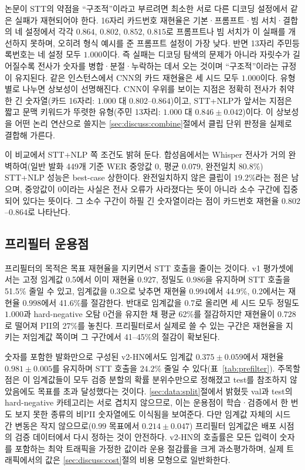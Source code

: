 \documentclass[10pt,twocolumn]{article}
\begin{document}
논문이 STT의 약점을 ``구조적''이라고 부르려면 최소한 서로 다른 디코딩 설정에서 같은 실패가
재현되어야 한다. 16자리 카드번호 재현율은 기본·프롬프트·빔 서치·결합의 네 설정에서 각각
$0.864$, $0.802$, $0.852$, $0.815$로 프롬프트나 빔 서치가 이 실패를 개선하지 못하며, 오히려
형식 예시를 준 프롬프트 설정이 가장 낮다. 반면 13자리 주민등록번호는 네 설정 모두 $1.000$이다.
즉 실패는 디코딩 탐색의 문제가 아니라 자릿수가 길어질수록 전사가 숫자를 병합·분절·누락하는 데서
오는 것이며 ``구조적''이라는 규정이 유지된다. 같은 인스턴스에서 CNN의 카드 재현율은 세 시드 모두
$1.000$이다. 유형별로 나누면 상보성이 선명해진다. CNN이 우위를 보이는 지점은 정확히 전사가
취약한 긴 숫자열(카드 16자리: $1.000$ 대 $0.802$--$0.864$)이고, STT+NLP가 앞서는 지점은 짧고
문맥 키워드가 뚜렷한 유형(주민 13자리: $1.000$ 대 $0.846\pm0.042$)이다. 이 상보성을 어떤 논리 연산으로 쓸지는 \ref{sec:discuss:combine}절에서 클립 단위 판정을 실제로
결합해 가른다.

이 비교에서 STT+NLP 쪽 조건도 밝혀 둔다. 합성음에서는 Whisper 전사가 거의 완벽하여(일반 발화
449개 기준 WER 중앙값 $0$, 평균 $0.079$, 완전일치 $80.8\%$) STT+NLP 성능은 best-case 상한이다.
완전일치하지 않은 클립이 $19.2\%$라는 점은 남으며, 중앙값이 0이라는 사실은 전사 오류가
사라졌다는 뜻이 아니라 소수 구간에 집중되어 있다는 뜻이다. 그 소수 구간이 하필 긴 숫자열이라는
점이 카드번호 재현율 $0.802$--$0.864$로 나타난다.

\subsection{프리필터 운용점}
프리필터의 목적은 목표 재현율을 지키면서 STT 호출을 줄이는 것이다. v1 평가셋에서는 고정 임계값
0.5에서 이미 재현율 $0.927$, 정밀도 $0.986$을 유지하며 STT 호출을 51.5\% 줄일 수 있고, 임계값을
0.3으로 낮추면 재현율 $0.994$에서 44.9\%, 0.2에서는 재현율 $0.998$에서 41.6\%를 절감한다. 반대로
임계값을 0.7로 올리면 세 시드 모두 정밀도 $1.000$과 hard-negative 오탐 0건을 유지한 채 평균
62\%를 절감하지만 재현율이 $0.728$로 떨어져 PII의 27\%를 놓친다. 프리필터로서 실제로 쓸 수 있는
구간은 재현율을 지키는 저임계값 쪽이며 그 구간에서 41--45\%의 절감이 확보된다.

숫자를 포함한 발화만으로 구성된 v2-HN에서도 임계값 $0.375\pm0.059$에서 재현율 $0.981\pm0.005$를
유지하며 STT 호출을 $24.2\%$ 줄일 수 있다(표~\ref{tab:prefilter}). 주목할 점은 이 임계값들이
모두 검증 분할의 확률 분위수만으로 정해졌고 test를 참조하지 않았음에도 목표를 초과 달성했다는
것이다. \ref{sec:data:split}절에서 밝혔듯 val과 test의 hard-negative 카테고리는 서로 겹치지
않으므로, 이는 운용점이 학습·검증에서 한 번도 보지 못한 종류의 비PII 숫자열에도 이식됨을
보여준다. 다만 임계값 자체의 시드 간 변동은 작지 않으므로($0.99$ 목표에서 $0.214\pm0.047$)
프리필터 임계값은 배포 시점의 검증 데이터에서 다시 정하는 것이 안전하다. v2-HN의 호출률은 모든
입력이 숫자를 포함하는 최악 트래픽을 가정한 값이라 운용 절감률을 크게 과소평가하며, 실제
트래픽에서의 값은 \ref{sec:discuss:cost}절의 비용 모형으로 일반화한다.
\end{document}
